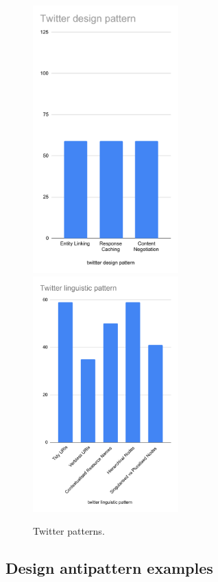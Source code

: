 \begin{figure}[htb!]
\includegraphics[width=0.5\textwidth]{img/exampleBars/twitterDesAnti.pdf}
\includegraphics[width=0.5\textwidth]{img/exampleBars/twitterLingPatt.pdf}
\caption{Twitter patterns.}
\label{fig:twitterBarPattEx}
\end{figure}

\clearpage

\subsection{Design antipattern examples}

